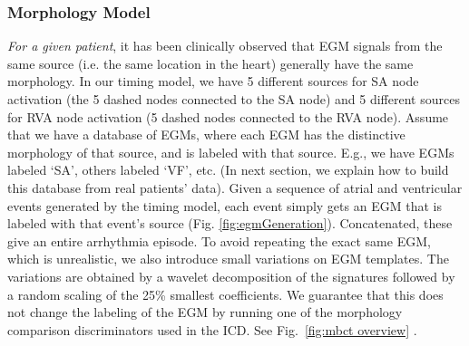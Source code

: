\subsubsection{Morphology Model}
\emph{For a given patient}, it has been clinically observed that \ac{EGM} signals from the same source (i.e. the same location in the heart) generally have the same morphology. 
In our timing model, we have 5 different sources for SA node activation (the 5 dashed nodes connected to the SA node) and 5 different sources for RVA node activation (5 dashed nodes connected to the RVA node). 
Assume that we have a database of \acp{EGM}, where each \ac{EGM} has the distinctive morphology of that source, and is labeled with that source.
E.g., we have \acp{EGM} labeled `SA', others labeled `VF', etc.
(In next section, we explain how to build this database from real patients' data).
Given a sequence of atrial and ventricular events generated by the timing model, each event simply gets an \ac{EGM} that is labeled with that event's source (Fig. \ref{fig:egmGeneration}).
Concatenated, these give an entire arrhythmia episode.
To avoid repeating the exact same \ac{EGM}, which is unrealistic, we also introduce small variations on EGM templates.
The variations are obtained by a wavelet decomposition of the signatures followed by a random scaling of the 25\% smallest coefficients.
We guarantee that this does not change the labeling of the \ac{EGM} by running one of the morphology comparison discriminators used in the ICD.
See Fig.~\ref{fig:mbct overview} .

